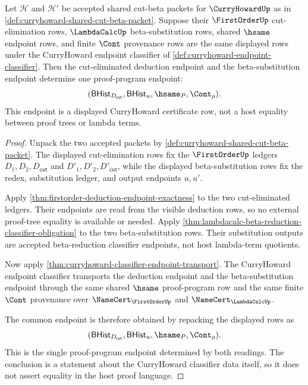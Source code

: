 \begin{theorem}\label{thm:curryhoward-cut-beta-proof-program-determinacy}
Let $\mathcal H$ and $\mathcal H'$ be accepted shared cut-beta packets for $\CurryHowardUp$ as in \autoref{def:curryhoward-shared-cut-beta-packet}. Suppose their $\FirstOrderUp$ cut-elimination rows, $\LambdaCalcUp$ beta-substitution rows, shared $\hsame$ endpoint rows, and finite $\Cont$ provenance rows are the same displayed rows under the CurryHoward endpoint classifier of \autoref{def:curryhoward-endpoint-classifier}. Then the cut-eliminated deduction endpoint and the beta-substitution endpoint determine one proof-program endpoint:
$$
(\mathsf{BHist}_{D_{\mathsf{cut}}},\mathsf{BHist}_{u},\hsame_{P},\Cont_{\rho}).
$$
This endpoint is a displayed CurryHoward certificate row, not a host equality between proof trees or lambda terms.
\end{theorem}
\begin{proof}
Unpack the two accepted packets by \autoref{def:curryhoward-shared-cut-beta-packet}. The displayed cut-elimination rows fix the $\FirstOrderUp$ ledgers $D_1,D_2,D_{\mathsf{cut}}$ and $D'_1,D'_2,D'_{\mathsf{cut}}$, while the displayed beta-substitution rows fix the redex, substitution ledger, and output endpoints $u,u'$.

Apply \autoref{thm:firstorder-deduction-endpoint-exactness} to the two cut-eliminated ledgers. Their endpoints are read from the visible deduction rows, so no external proof-tree equality is available or needed. Apply \autoref{thm:lambdacalc-beta-reduction-classifier-obligation} to the two beta-substitution rows. Their substitution outputs are accepted beta-reduction classifier endpoints, not host lambda-term quotients.

Now apply \autoref{thm:curryhoward-classifier-endpoint-transport}. The CurryHoward endpoint classifier transports the deduction endpoint and the beta-substitution endpoint through the same shared $\hsame$ proof-program row and the same finite $\Cont$ provenance over $\NameCert_{\FirstOrderUp}$ and $\NameCert_{\LambdaCalcUp}$.

The common endpoint is therefore obtained by repacking the displayed rows as
$$
(\mathsf{BHist}_{D_{\mathsf{cut}}},\mathsf{BHist}_{u},\hsame_{P},\Cont_{\rho}).
$$
This is the single proof-program endpoint determined by both readings. The conclusion is a statement about the CurryHoward classifier data itself, so it does not assert equality in the host proof language.
\end{proof}

